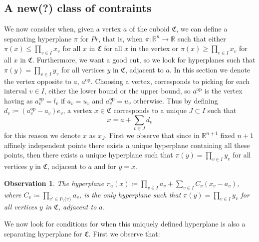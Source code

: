 \documentclass{article}
\newtheorem{observation}[theorem]{Observation}
\begin{document}
\subsection{A new(?) class of contraints}
\newcommand{\aop}{a^{\text{op}}}
\newcommand{\prodset}{Pr}
\newcommand{\pisum}[1]{\prod_{v \in I\setminus{\{#1\}}}a_v (\aop_{#1}-a_{#1})}
We now consider when, given a vertex \(a\) of the cuboid \(\mathfrak{C}\), we can define a separating hyperplane \(\pi\) for \(\prodset\), that is, when \(\pi: \mathbb{R}^n \to \mathbb{R}\)
such that either \(\pi(x) \leq \prod_{v \in I}x_v\) for all \(x\) in \(\mathfrak{C}\) for all \(x\) in the vertex or \(\pi(x) \geq \prod_{v \in I}x_v\)
for all \(x\) in \(\mathfrak{C}\). Furthermore, we want a good cut, so we look for hyperplanes such that \(\pi(y) = \prod_{v \in I}y_v\) for all vertices \(y\) in \(\mathfrak{C}\), adjacent to \(a\). 
%
In this section we denote the vertex opposite to \(a\), \(\aop\). Choosing a vertex, corresponds to picking for each interval \(v \in I\), 
either the lower bound or the upper bound, so \(\aop\) is the vertex having as \(\aop_v = l_v\) if \(a_v = u_v\) and \(\aop_v = u_v\) otherwise.
%
Thus by defining \(d_v \coloneqq (\aop_v - a_v)e_v\), a vertex \(x \in \mathfrak{C}\) corresponds to a unique \(J \subset I\) such that \[x = a + \sum_{v \in J} d_v\]
for this reason we denote \(x\) as \(x_J\).
%
First we observe that since in \(\mathbb{R}^{n+1}\) fixed \(n+1\) affinely independent points there exists a unique hyperplane containing all these points, then there exists a unique hyperplane such that \(\pi(y) = \prod_{v \in I}y_v\) for all vertices \(y\) in \(\mathfrak{C}\), adjacent to \(a\) and for \(y = x\).
\begin{observation}
	The hyperplane \(\pi_a(x) \coloneqq \prod_{v \in I}a_v + \sum_{v \in I} C_v(x_v - a_v)\), 
	where \(C_v \coloneqq \prod_{v' \in I \setminus \{v\}}a_v\), is the only hyperplane such that \(\pi(y) = \prod_{v \in I}y_v\) for all vertices \(y\) in \(\mathfrak{C}\), adjacent to \(a\).
\end{observation}
%
We now look for conditions for when this uniquely defined hyperplane is also a separating hyperplane for \(\mathfrak{C}\). First we observe that: 
\end{document}
